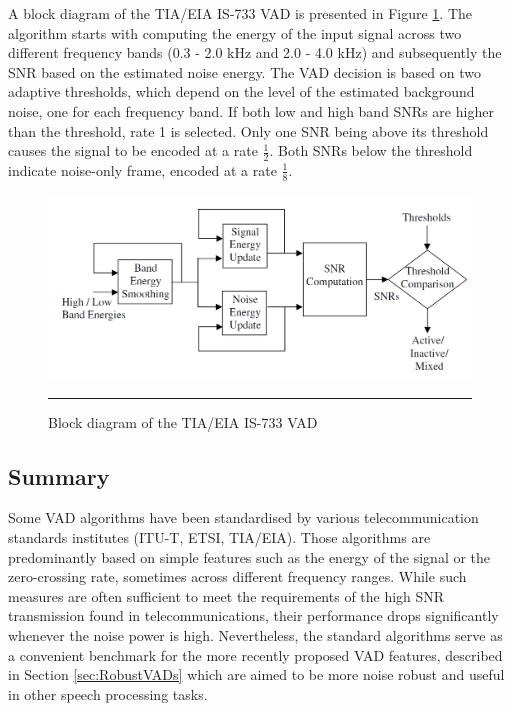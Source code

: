 A block diagram of the TIA/EIA IS-733 VAD is presented in Figure \ref{fig:IS733}. The algorithm starts with computing the energy of the input signal across two different frequency bands (0.3 - 2.0 kHz and 2.0 - 4.0 kHz) and subsequently the SNR based on the estimated noise energy. The VAD decision is based on two adaptive thresholds, which depend on the level of the estimated background noise, one for each frequency band. If both low and high band SNRs are higher than the threshold, rate 1 is selected. Only one SNR being above its threshold causes the signal to be encoded at a rate $\frac{1}{2}$. Both SNRs below the threshold indicate noise-only frame, encoded at a rate $\frac{1}{8}$.

\begin{figure}[htbp]
	\centering
		\includegraphics[width=0.9\columnwidth]{Figures/Chapter2/IS733.png}
		\rule{37em}{0.5pt}
	\caption[Block diagram of the TIA/EIA IS-733 VAD]{Block diagram of the TIA/EIA IS-733 VAD \cite{Kondoz}}
	\label{fig:IS733}
\end{figure}

\subsection{Summary}

Some VAD algorithms have been standardised by various telecommunication standards institutes (ITU-T, ETSI, TIA/EIA). Those algorithms are predominantly based on simple features such as the energy of the signal or the zero-crossing rate, sometimes across different frequency ranges. While such measures are often sufficient to meet the requirements of the high SNR transmission found in telecommunications, their performance drops significantly whenever the noise power is high. Nevertheless, the standard algorithms serve as a convenient benchmark for the more recently proposed VAD features, described in Section \ref{sec:RobustVADs} which are aimed to be more noise robust and useful in other speech processing tasks.

